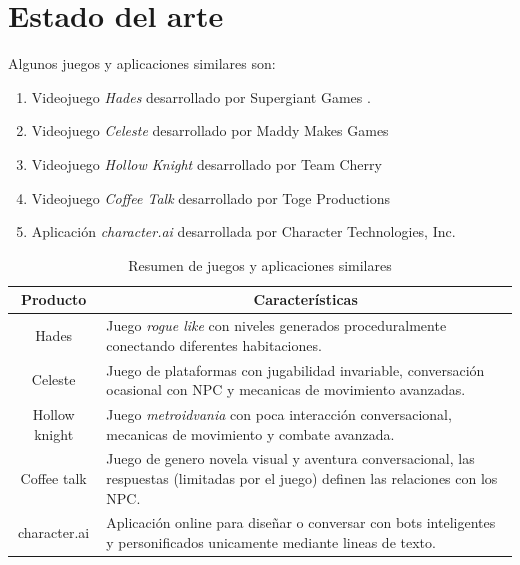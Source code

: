 \documentclass[12pt,twoside]{article}
\begin{document}
	\section{Estado del arte}%
	Algunos juegos y aplicaciones similares son:
	\begin{enumerate}[noitemsep]
		\item Videojuego \textit{Hades} desarrollado por Supergiant Games \cite{game:hades}. 

		\item Videojuego \textit{Celeste} desarrollado por Maddy Makes Games \cite{game:celeste}

		\item Videojuego \textit{Hollow Knight} desarrollado por Team Cherry \cite{game:hollow}
		
		\item Videojuego \textit{Coffee Talk} desarrollado por Toge Productions \cite{game: coffee}
		
		\item Aplicación \textit{character.ai} desarrollada por Character Technologies, Inc. \cite{app: character}
	\end{enumerate}
	
	\begin{table}[H]
		\centering
		\begin{tabular}{|c|p{9cm}|}
			\hline
			\textbf{Producto} & \multicolumn{1}{c|}{\textbf{Características}} \\ \hline
			 Hades &  Juego \textit{rogue like}  con niveles generados proceduralmente conectando diferentes habitaciones.\\ \hline
			 
			 Celeste &  Juego de plataformas con jugabilidad invariable, conversación ocasional con NPC y mecanicas de movimiento avanzadas. \\ \hline
			 
			 Hollow knight &   Juego \textit{metroidvania} con poca interacción conversacional, mecanicas de movimiento y combate avanzada. \\ \hline
			 
			 Coffee talk &   Juego de genero novela visual y aventura conversacional, las respuestas (limitadas por el juego) definen las relaciones con los NPC. \\ \hline
			 
			 character.ai&   Aplicación online para diseñar o conversar con bots inteligentes y personificados unicamente mediante lineas de texto. \\ \hline
		\end{tabular}
		\caption{Resumen de juegos y aplicaciones similares}
		\label{table:aplicaciones}
	\end{table} 
	
\end{document}
